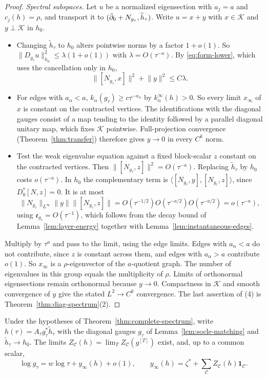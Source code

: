 \begin{proof}
\emph{Spectral subspaces.} Let $u$ be a normalized eigensection with
$a_j=a$ and $c_j(h)=\rho$, and
transport it to $(\bar\partial_0+N_{g_\tau},\widetilde h_\tau)$. Write $u=x+y$ with
$x\in\mathcal K$ and $y\perp\mathcal K$ in $h_0$.
\begin{itemize}
\item Changing $\widetilde h_\tau$ to $h_0$ alters pointwise norms by a
 factor $1+o(1)$. So $\lVert D_{g_\tau}u\rVert_{h_0}^2\le\lambda(1+o(1))$
 with $\lambda=O(\tau^{-a})$. By \eqref{eq:form-lower}, which uses the
 cancellation only in $h_0$,
 \[
  \lVert[N_{g_\tau},x]\rVert^2+\lVert y\rVert^2\le C\lambda.
 \]
\item For edges with $a_\alpha<a$, $k_\alpha(g_\tau)\ge c\tau^{-a_\alpha}$
 by $k^\infty_\alpha(h)>0$. So every limit $x_\infty$ of $x$ is constant on
 the contracted vertices. The identifications with the diagonal gauges consist of a map
 tending to the identity followed by a parallel diagonal unitary map, which
 fixes $\mathcal K$ pointwise. Full-projection convergence
 (Theorem~\ref{thm:transfer}) therefore gives $y\to0$ in every $C^k$
 norm.
\item Test the weak eigenvalue equation against a fixed block-scalar $z$
 constant on the contracted vertices. Then
 $\lVert[N_{g_\tau},z]\rVert^2=O(\tau^{-a})$. Replacing $\widetilde h_\tau$
 by $h_0$ costs $o(\tau^{-a})$. In $h_0$ the complementary term is
 $\langle[N_{g_\tau},y],[N_{g_\tau},z]\rangle$, since $D_0^*[N,z]=0$. It is
 at most
 \[
  \lVert N_{g_\tau}\rVert_{L^\infty}\lVert y\rVert\lVert[N_{g_\tau},z]\rVert
  =O(\tau^{-1/2})O(\tau^{-a/2})O(\tau^{-a/2})=o(\tau^{-a}),
 \]
 using $\mathfrak e_{g_\tau}=O(\tau^{-1})$, which follows from the decay bound of
 Lemma~\ref{lem:layer-energy} together with
 Lemma~\ref{lem:instantaneous-edges}.
\end{itemize}
Multiply by $\tau^a$ and pass to the limit, using the edge limits. Edges
with $a_\alpha<a$ do not contribute, since $z$ is constant across them, and
edges with $a_\alpha>a$ contribute $o(1)$. So $x_\infty$ is a
$\rho$-eigenvector of the $a$-quotient graph. The number of eigenvalues in
this group equals the multiplicity of $\rho$. Limits of orthonormal
eigensections remain orthonormal because $y\to0$. Compactness in
$\mathcal K$ and smooth convergence of $y$ give the stated $L^2\to C^k$
convergence. The last assertion of (4) is
Theorem~\ref{thm:diag-spectrum}(2).
\end{proof}

\begin{corollary}\label{cor:metric-asymptotics}
Under the hypotheses of Theorem~\ref{thm:complete-spectrum}, write
$h(\tau)=A_\tau g_\tau^*\widetilde h_\tau$ with the diagonal gauges $g_\tau$
of Lemma~\ref{lem:socle-matching} and $\widetilde h_\tau\to h_0$. The limits
$Z_{\mathcal C}(h)=\lim_TZ_{\mathcal C}(g^{[T]})$ exist, and, up to a common
scalar,
\[
 \log g_\tau=w\log\tau+y_\infty(h)+o(1),\qquad
 y_\infty(h)=\zeta^*+\sum_{\mathcal C}Z_{\mathcal C}(h)\mathbf 1_{\mathcal C}.
\]
\end{corollary}


